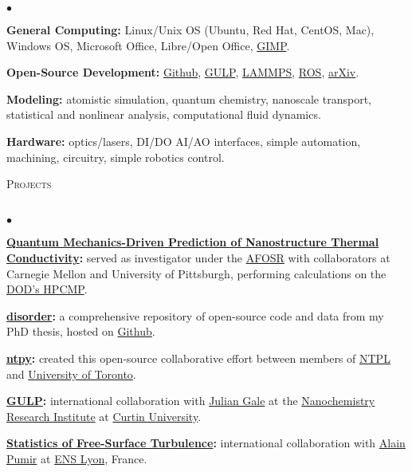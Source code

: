 \documentclass{article}
\newcommand{\lineunder}{\vspace*{-8pt} \\ \hspace*{-18pt} \hrulefill \\}
\newcommand{\header}[1]{{\hspace*{-15pt}\vspace*{6pt} \textsc{#1}} \vspace*{-6pt} \lineunder}
\newenvironment{achievements}{\begin{list}{$\bullet$}{\topsep 0pt \itemsep -2pt}}{\vspace*{4pt}\end{list}}
\begin{document}
\begin{achievements}
\item \textbf{General Computing:} Linux/Unix OS (Ubuntu, Red Hat, CentOS, Mac), Windows OS, Microsoft Office, Libre/Open Office, \href{http://www.gimp.org/}{GIMP}.

\item \textbf{Open-Source Development:} \href{http://github.com/jasonlarkin}{Github}, \href{http://projects.ivec.org/gulp/}{GULP}, \href{http://lammps.sandia.gov/}{LAMMPS}, \href{http://www.ros.org/}{ROS}, \href{http://arxiv.org/find/physics/1/au:+Larkin_J/0/1/0/all/0/1}{arXiv}.

\item \textbf{Modeling:} atomistic simulation, quantum chemistry, nanoscale transport, statistical and nonlinear analysis, computational fluid dynamics. 

\item \textbf{Hardware:} optics/lasers, DI/DO AI/AO interfaces, simple automation, machining, circuitry, simple robotics control.
\end{achievements}

\header{Projects}
\begin{achievements}
\item \textbf{\href{http://ntpl.me.cmu.edu/research.html}{Quantum Mechanics-Driven Prediction of Nanostructure Thermal Conductivity}:}
served as investigator under the 
\href{http://www.wpafb.af.mil/afrl/afosr/}{AFOSR} with collaborators at Carnegie Mellon and University of Pittsburgh, performing 
calculations on the \href{http://www.hpcmo.hpc.mil/cms2/index.php}{DOD's HPCMP}.

\item \textbf{\href{https://github.com/jasonlarkin/disorder}{disorder}:} a comprehensive repository of open-source code and data from my PhD thesis, hosted on \href{http://github.com/jasonlarkin}{Github}.

\item \textbf{\href{https://github.com/ntpl/ntpy}{ntpy}:} created this open-source  collaborative effort between members of \href{http://ntpl.me.cmu.edu/}{NTPL} and \href{http://www.mie.utoronto.ca/labs/atoms/}{University of Toronto}.

\item \textbf{\href{http://projects.ivec.org/gulp/}{GULP}:} international collaboration with \href{http://nanochemistry.curtin.edu.au/people/staff.cfm/J.Gale}{Julian Gale} at the 
\href{http://nanochemistry.curtin.edu.au/}{Nanochemistry Research Institute} at \href{http://www.curtin.edu.au/}{Curtin University}.

\item \textbf{\href{http://jasonlarkin.github.io/projects-ms.html}{Statistics of Free-Surface Turbulence}:} international collaboration with \href{http://perso.ens-lyon.fr/alain.pumir/Pumir_webpage.html}{Alain Pumir} at \href{http://www.ens-lyon.eu/annuaire/m-pumir-alain-83656.kjsp?RH=ZYZYZYZYZYZYZYZYZYZYZY}{ENS Lyon}, France.

\end{achievements}
\end{document}
